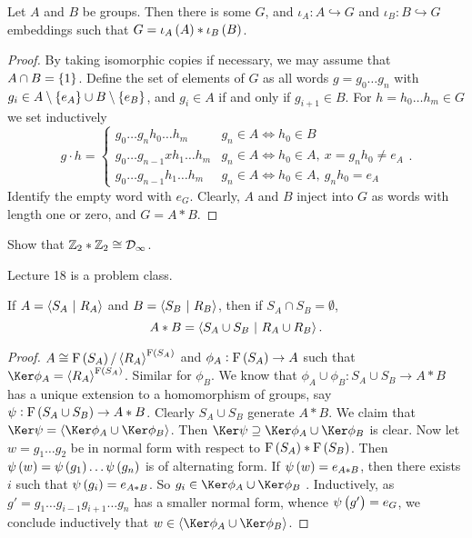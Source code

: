 \begin{lemma}
Let $ A $ and $ B $ be groups. Then there is some $ G $, and $ \iota_A : A \hookrightarrow G $ and $ \iota_B : B \hookrightarrow G $ embeddings such that $ G = \iota_A\br{A} * \iota_B\br{B} $.
\end{lemma}

\begin{proof}
By taking isomorphic copies if necessary, we may assume that $ A \cap B = \cbr{1} $. Define the set of elements of $ G $ as all words $ g = g_0 \dots g_n $ with $ g_i \in A \setminus \cbr{e_A} \cup B \setminus \cbr{e_B} $, and $ g_i \in A $ if and only if $ g_{i + 1} \in B $. For $ h = h_0 \dots h_m \in G $ we set inductively
$$ g \cdot h =
\begin{cases}
g_0 \dots g_nh_0 \dots h_m & g_n \in A \iff h_0 \in B \\
g_0 \dots g_{n - 1}xh_1 \dots h_m & g_n \in A \iff h_0 \in A, \ x = g_nh_0 \ne e_A \\
g_0 \dots g_{n - 1}h_1 \dots h_m & g_n \in A \iff h_0 \in A, \ g_nh_0 = e_A
\end{cases}.
$$
Identify the empty word with $ e_G $. Clearly, $ A $ and $ B $ inject into $ G $ as words with length one or zero, and $ G = A * B $.
\end{proof}

\begin{exercise}
Show that $ \mathbb{Z}_2 * \mathbb{Z}_2 \cong \mathcal{D}_\infty $.
\end{exercise}


Lecture 18 is a problem class.

\pagebreak


\begin{proposition}
If $ A = \left\langle S_A \ \middle| \  R_A \right\rangle $ and $ B = \left\langle S_B \ \middle| \  R_B \right\rangle $, then if $ S_A \cap S_B = \emptyset $,
$$ A * B = \left\langle S_A \cup S_B \ \middle| \  R_A \cup R_B \right\rangle. $$
\end{proposition}

\begin{proof}
$ A \cong \F\br{S_A} / \abr{R_A}^{\F\br{S_A}} $ and $ \phi_A : \F\br{S_A} \to A $ such that $ \Ker \phi_A = \abr{R_A}^{\F\br{S_A}} $. Similar for $ \phi_B $. We know that $ \phi_A \cup \phi_B : S_A \cup S_B \to A * B $ has a unique extension to a homomorphism of groups, say $ \psi : \F\br{S_A \cup S_B} \to A * B $. Clearly $ S_A \cup S_B $ generate $ A * B $. We claim that $ \Ker \psi = \abr{\Ker \phi_A \cup \Ker \phi_B} $. Then $ \Ker \psi \supseteq \Ker \phi_A \cup \Ker \phi_B $ is clear. Now let $ w = g_1 \dots g_2 $ be in normal form with respect to $ \F\br{S_A} * \F\br{S_B} $. Then $ \psi\br{w} = \psi\br{g_1} \dots \psi\br{g_n} $ is of alternating form. If $ \psi\br{w} = e_{A * B} $, then there exists $ i $ such that $ \psi\br{g_i} = e_{A * B} $. So $ g_i \in \Ker \phi_A \cup \Ker \phi_B $ . Inductively, as $ g' = g_1 \dots g_{i - 1}g_{i + 1} \dots g_n $ has a smaller normal form, whence $ \psi\br{g'} = e_G $, we conclude inductively that $ w \in \abr{\Ker \phi_A \cup \Ker \phi_B} $.
\end{proof}

